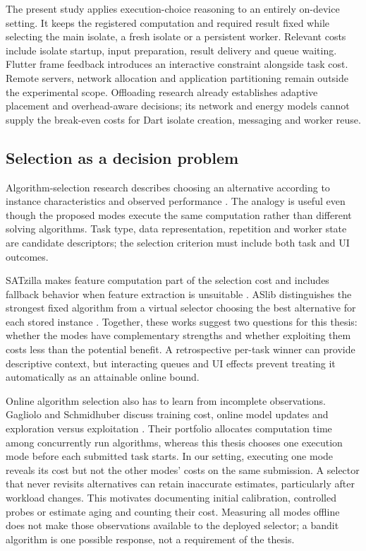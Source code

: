 \documentclass[14pt,a4paper,oneside]{extreport}
\begin{document}
The present study applies execution-choice reasoning to an entirely on-device setting. It
keeps the registered computation and required result fixed while selecting the main
isolate, a fresh isolate or a persistent worker. Relevant costs include isolate startup,
input preparation, result delivery and queue waiting. Flutter frame feedback introduces an
interactive constraint alongside task cost. Remote servers, network allocation and
application partitioning remain outside the experimental scope. Offloading research already
establishes adaptive placement and overhead-aware decisions; its network and energy models
cannot supply the break-even costs for Dart isolate creation, messaging and worker reuse.

\subsection{Selection as a decision problem}
\label{selection-as-a-decision-problem}

Algorithm-selection research describes choosing an alternative according to instance
characteristics and observed performance \citep{smithmiles2009}. The analogy is useful even
though the proposed modes execute the same computation rather than different solving
algorithms. Task type, data representation, repetition and worker state are candidate
descriptors; the selection criterion must include both task and UI outcomes.

SATzilla makes feature computation part of the selection cost and includes fallback behavior
when feature extraction is unsuitable \citep{satzilla2008}. ASlib distinguishes the strongest
fixed algorithm from a virtual selector choosing the best alternative for each stored instance
\citep{aslib2016}. Together, these works suggest two questions for this thesis: whether the
modes have complementary strengths and whether exploiting them costs less than the potential
benefit. A retrospective per-task winner can provide descriptive context, but interacting
queues and UI effects prevent treating it automatically as an attainable online bound.

Online algorithm selection also has to learn from incomplete observations. Gagliolo and
Schmidhuber discuss training cost, online model updates and exploration versus exploitation
\citep[Secs. 1, 5--6]{gagliolo2006}. Their portfolio allocates computation time among
concurrently run algorithms, whereas this thesis chooses one execution mode before each
submitted task starts. In our setting, executing one mode reveals its cost but not the other
modes' costs on the same submission. A selector that never revisits alternatives can retain
inaccurate estimates, particularly after workload changes. This motivates documenting initial
calibration, controlled probes or estimate aging and counting their cost. Measuring all modes
offline does not make those observations available to the deployed selector; a bandit
algorithm is one possible response, not a requirement of the thesis.
\end{document}
